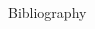 \documentclass[final,hyperref={pdfpagelabels=false}]{beamer}
\begin{document}
\begin{frame}{}
\begin{block}{Bibliography}
\begin{multicols}{2}[\frametitle{\insertsection} ]
				   
				   
				   
				   \end{multicols}
                  	\end{block}
                         
                         

  \end{frame}
\end{document}

